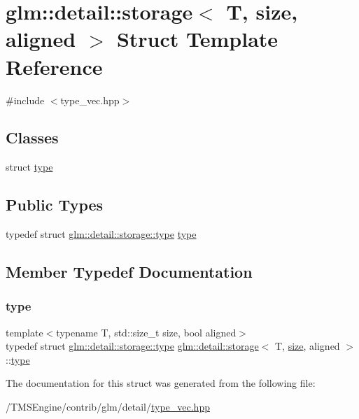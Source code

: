 \hypertarget{structglm_1_1detail_1_1storage}{}\section{glm\+:\+:detail\+:\+:storage$<$ T, size, aligned $>$ Struct Template Reference}
\label{structglm_1_1detail_1_1storage}


{\ttfamily \#include $<$type\+\_\+vec.\+hpp$>$}

\subsection*{Classes}
\begin{DoxyCompactItemize}
\item 
struct \hyperlink{structglm_1_1detail_1_1storage_1_1type}{type}
\end{DoxyCompactItemize}
\subsection*{Public Types}
\begin{DoxyCompactItemize}
\item 
typedef struct \hyperlink{structglm_1_1detail_1_1storage_1_1type}{glm\+::detail\+::storage\+::type} \hyperlink{structglm_1_1detail_1_1storage_a11188a4949646a1c74aea5181fc8213d}{type}
\end{DoxyCompactItemize}


\subsection{Member Typedef Documentation}
\mbox{\label{structglm_1_1detail_1_1storage_a11188a4949646a1c74aea5181fc8213d}} 
\subsubsection{\texorpdfstring{type}{type}}
{\footnotesize\ttfamily template$<$typename T, std\+::size\+\_\+t size, bool aligned$>$ \\
typedef struct \hyperlink{structglm_1_1detail_1_1storage_1_1type}{glm\+::detail\+::storage\+::type}  \hyperlink{structglm_1_1detail_1_1storage}{glm\+::detail\+::storage}$<$ T, \hyperlink{_s_d_l__opengl__glext_8h_a3d1e3edfcf61ca2d831883e1afbad89e}{size}, aligned $>$\+::\hyperlink{structglm_1_1detail_1_1storage_1_1type}{type}}



The documentation for this struct was generated from the following file\+:\begin{DoxyCompactItemize}
\item 
/\+T\+M\+S\+Engine/contrib/glm/detail/\hyperlink{type__vec_8hpp}{type\+\_\+vec.\+hpp}\end{DoxyCompactItemize}
